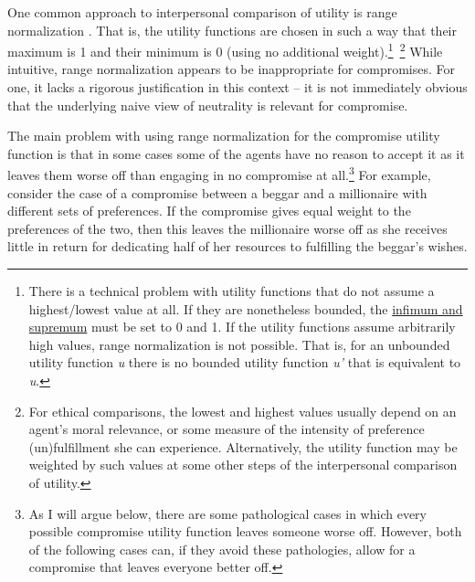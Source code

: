 One common approach to interpersonal comparison of utility is range
normalization \parencite{Isbell1959-ql,Hausman1995-ry}. That
is, the utility functions are chosen in such a way that their maximum is
1 and their minimum is 0 (using no additional weight).\footnote{There is
  a technical problem with utility functions that do not assume a
  highest/lowest value at all. If they are nonetheless bounded, the
  \href{https://en.wikipedia.org/wiki/Infimum_and_supremum}{infimum
  and supremum} must be set to 0 and 1. If the utility functions assume
  arbitrarily high values, range normalization is not possible. That is,
  for an unbounded utility function \emph{u} there is no bounded utility
  function \emph{u'} that is equivalent to \emph{u}.}~\footnote{For
  ethical comparisons, the lowest and highest values usually depend on
  an agent's moral relevance, or some measure of the intensity of
  preference (un)fulfillment she can experience. Alternatively, the
  utility function may be weighted by such values at some other steps of
  the interpersonal comparison of utility.} While intuitive, range
normalization appears to be inappropriate for compromises. For one, it
lacks a rigorous justification in this context -- it is not immediately
obvious that the underlying naive view of neutrality is relevant for
compromise.

The main problem with using range normalization for the compromise
utility function is that in some cases some of the agents have no reason
to accept it as it leaves them worse off than engaging in no compromise
at all.\footnote{As I will argue below, there are some pathological
  cases in which every possible compromise utility function leaves
  someone worse off. However, both of the following cases can, if they
  avoid these pathologies, allow for a compromise that leaves everyone
  better off.} For example, consider the case of a compromise between a
beggar and a millionaire with different sets of preferences. If the
compromise gives equal weight to the preferences of the two, then this
leaves the millionaire worse off as she receives little in return for
dedicating half of her resources to fulfilling the beggar's wishes.

